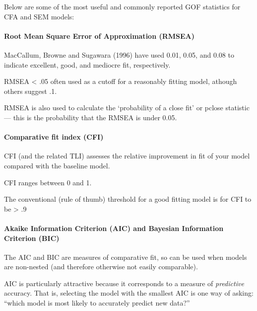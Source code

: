\documentclass[]{article}
\let\oldparagraph\paragraph
\renewcommand{\paragraph}[1]{\oldparagraph{#1}\mbox{}}
\begin{document}
Below are some of the most useful and commonly reported GOF statistics for CFA
and SEM models:

\hypertarget{root-mean-square-error-of-approximation-rmsea}{%
\paragraph{Root Mean Square Error of Approximation (RMSEA)}\label{root-mean-square-error-of-approximation-rmsea}}

MacCallum, Browne and Sugawara (1996) have used 0.01, 0.05, and 0.08 to indicate
excellent, good, and mediocre fit, respectively.

RMSEA \textless{} .05 often used as a cutoff for a reasonably fitting model, athough
others suggest .1.

RMSEA is also used to calculate the `probability of a close fit' or pclose
statistic --- this is the probability that the RMSEA is under 0.05.

\hypertarget{comparative-fit-index-cfi}{%
\paragraph{Comparative fit index (CFI)}\label{comparative-fit-index-cfi}}

CFI (and the related TLI) assesses the relative improvement in fit of your model
compared with the baseline model.

CFI ranges between 0 and 1.

The conventional (rule of thumb) threshold for a good fitting model is for CFI
to be \textgreater{} .9

\hypertarget{akaike-information-criterion-aic-and-bayesian-information-criterion-bic}{%
\paragraph{Akaike Information Criterion (AIC) and Bayesian Information Criterion (BIC)}\label{akaike-information-criterion-aic-and-bayesian-information-criterion-bic}}

The AIC and BIC are measures of comparative fit, so can be used when models are
non-nested (and therefore otherwise not easily comparable).

AIC is particularly attractive because it corresponds to a measure of
\emph{predictive} accuracy. That is, selecting the model with the smallest AIC is one
way of asking: ``which model is most likely to accurately predict new data?''
\end{document}

